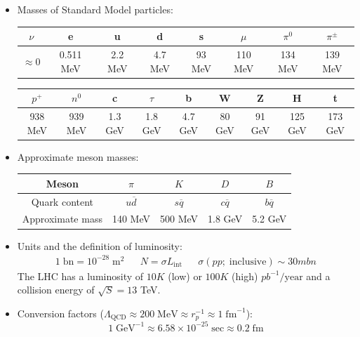 \documentclass[11pt, oneside]{article}   	%
\theoremstyle{definition}
\numberwithin{equation}{subsection}		%
\begin{document}
\begin{itemize}

	\item Masses of Standard Model particles:
	\begin{table}[H]
	\centering
	\begin{tabular}{ | c | c | c | c | c | c | c | c | }
		\hline
		$\nu$ & e & u & d & s & $\mu$ & $\pi^0$ & $\pi^\pm$ \\
		\hline
		$\approx 0$ & 0.511 MeV & 2.2 MeV & 4.7 MeV & 93 MeV & 110 MeV & 134 MeV & 139 MeV \\
		\hline
		\end{tabular}
		\begin{tabular}{ | c | c | c | c | c | c | c | c | c | }
		\hline
		$p^+$ & $n^0$ & c & $\tau$ & b & W & Z & H & t \\
		\hline
		938 MeV & 939 MeV & 1.3 GeV & 1.8 GeV & 4.7 GeV & 80 GeV & 91 GeV & 125 GeV & 173 GeV \\
		\hline
	\end{tabular}
	\end{table}
	
	\item Approximate meson masses:
	\begin{table}[H]
	\centering
	\begin{tabular}{ | c | c | c | c | c | }
		\hline
		Meson & $\pi$ & $K$ & $D$ & $B$ \\
		\hline
		Quark content & $u\overline d$ & $s\overline q$ & $c\overline q$ & $b\overline q$ \\
		\hline
		Approximate mass & 140 MeV & 500 MeV & 1.8 GeV & 5.2 GeV \\
		\hline
		\end{tabular}
	\end{table}

	\item Units and the definition of luminosity:
	\begin{align}
		1\;\mathrm{bn} = 10^{-28} \;\mathrm{m}^2 && N = \sigma L_\mathrm{int} && \sigma(pp; \;\mathrm{inclusive})\sim 30 mbn
	\end{align}
	The LHC has a luminosity of $10K$ (low) or $100K$ (high) $pb^{-1} / \mathrm{year}$ and a collision energy of $\sqrt S = 13$ TeV.

	\item Conversion factors ($\Lambda_\mathrm{QCD}\approx 200\;\mathrm{MeV}\approx r_p^{-1}\approx 1 \;\mathrm{fm}^{-1}$):
	\begin{equation}
		1 \;\mathrm{GeV}^{-1} \approx 6.58\times 10^{-25}\;\mathrm{sec}\approx 0.2 \;\mathrm{fm}
	\end{equation}


\end{itemize}
\end{document}
